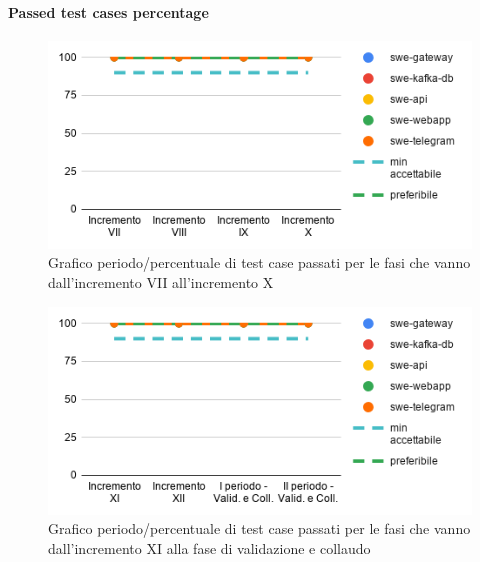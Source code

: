 \paragraph{Passed test cases percentage}
	\begin{figure}[H]
			\centering
			\includegraphics[width=0.8\linewidth]{./res/images/QM-TEST-4-PTCP.png}
			\caption{Grafico periodo/percentuale di test case passati per le fasi che vanno dall'incremento VII all'incremento X}
			\label{fig:Grafico periodo/percentuale di test case passati per le fasi che vanno dall'incremento VII all'incremento X}
	\end{figure}
	\begin{figure}[H]
			\centering
			\includegraphics[width=0.8\linewidth]{./res/images/QM-TEST-4-PTCP_1.png}
			\caption{Grafico periodo/percentuale di test case passati per le fasi che vanno dall'incremento XI alla fase di validazione e collaudo}
			\label{fig:Grafico periodo/percentuale di test case passati per le fasi che vanno dall'incremento XI alla fase di validazione e collaudo}
	\end{figure}

